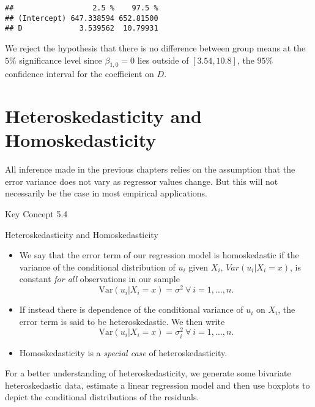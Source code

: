 \documentclass[]{book}
\theoremstyle{definition}
\theoremstyle{definition}
\theoremstyle{definition}
\theoremstyle{remark}
\begin{document}
\begin{verbatim}
##                  2.5 %    97.5 %
## (Intercept) 647.338594 652.81500
## D             3.539562  10.79931
\end{verbatim}

We reject the hypothesis that there is no difference between group means
at the \(5\%\) significance level since \(\beta_{1,0} = 0\) lies outside
of \([3.54, 10.8]\), the \(95\%\) confidence interval for the
coefficient on \(D\).

\section{Heteroskedasticity and
Homoskedasticity}\label{heteroskedasticity-and-homoskedasticity}

All inference made in the previous chapters relies on the assumption
that the error variance does not vary as regressor values change. But
this will not necessarily be the case in most empirical applications.

Key Concept 5.4

Heteroskedasticity and Homoskedasticity

\begin{itemize}
\item
  We say that the error term of our regression model is homoskedastic if
  the variance of the conditional distribution of \(u_i\) given \(X_i\),
  \(Var(u_i|X_i=x)\), is constant \emph{for all} observations in our
  sample \[ \text{Var}(u_i|X_i=x) = \sigma^2 \ \forall \ i=1,\dots,n. \]
\item
  If instead there is dependence of the conditional variance of \(u_i\)
  on \(X_i\), the error term is said to be heteroskedastic. We then
  write
  \[ \text{Var}(u_i|X_i=x) = \sigma_i^2 \ \forall \ i=1,\dots,n. \]
\item
  Homoskedasticity is a \emph{special case} of heteroskedasticity.
\end{itemize}

For a better understanding of heteroskedasticity, we generate some
bivariate heteroskedastic data, estimate a linear regression model and
then use boxplots to depict the conditional distributions of the
residuals.
\end{document}
